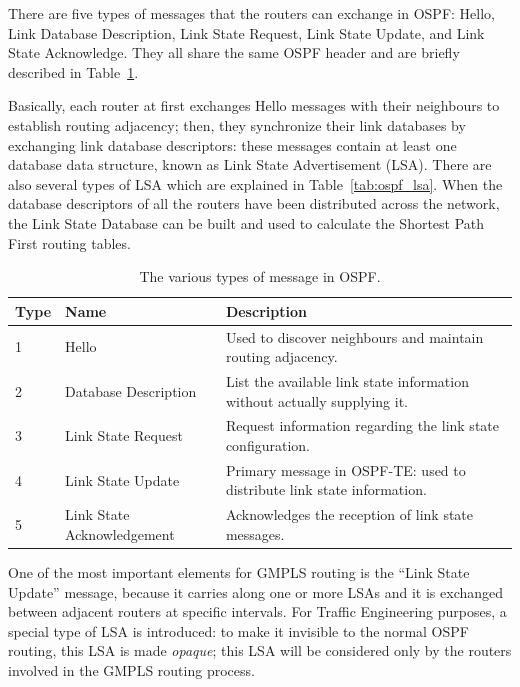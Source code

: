 \documentclass[10pt,a4paper]{report}
\begin{document}
There are five types of messages that the routers can exchange in
OSPF: Hello, Link Database Description, Link State Request, Link State
Update, and Link State Acknowledge. They all share the same OSPF
header and are briefly described in Table~\ref{tab:ospf_messages}.

Basically, each router at first exchanges Hello messages with their
neighbours to establish routing adjacency; then, they synchronize
their link databases by exchanging link database descriptors: these
messages contain at least one database data structure, known as Link
State Advertisement (LSA). There are also several types of LSA which
are explained in Table~\ref{tab:ospf_lsa}. When the database
descriptors of all the routers have been distributed across the
network, the Link State Database can be built and used to calculate
the Shortest Path First routing tables.

\begin{table}[!tbp]
  \begin{center}
    \begin{tabular}{|l|l|p{}|}
      \hline
      Type & Name & Description \\ \hline
      1 & Hello & Used to discover neighbours and maintain routing
      adjacency. \\
      2 & Database Description & List the available link state
      information without actually supplying it. \\
      3 & Link State Request & Request information regarding the link
      state configuration. \\
      4 & Link State Update & Primary message in OSPF-TE: used to
      distribute link state information. \\
      5 & Link State Acknowledgement & Acknowledges the reception of
      link state messages. \\
      \hline
    \end{tabular}
    \caption[OSPF messages]{The various types of message in OSPF.}
    \label{tab:ospf_messages}
  \end{center}
\end{table}

One of the most important elements for GMPLS routing is the ``Link
State Update'' message, because it carries along one or more LSAs and
it is exchanged between adjacent routers at specific intervals. For
Traffic Engineering purposes, a special type of LSA is introduced: to
make it invisible to the normal OSPF routing, this LSA is made
\textit{opaque}; this LSA will be considered only by the routers
involved in the GMPLS routing process.
\end{document}
